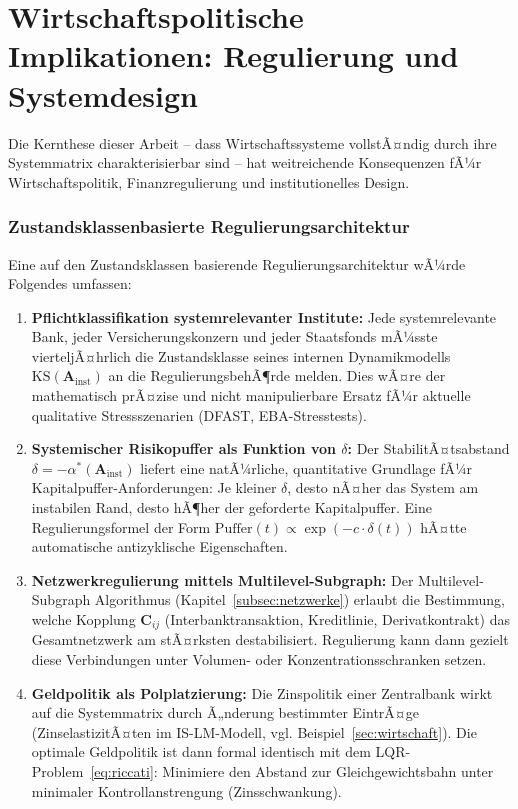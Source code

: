 ﻿\documentclass[12pt, a4paper, titlepage]{report}
\theoremstyle{definition}
\theoremstyle{remark}
\newcommand{\vA}{\bm{A}}
\newcommand{\vC}{\bm{C}}
\newcommand{\KS}{\mathrm{KS}}
\begin{document}
\section{Wirtschaftspolitische Implikationen: Regulierung und Systemdesign}
\label{subsec:wirtschaftspolitik}

Die Kernthese dieser Arbeit -- dass Wirtschaftssysteme vollstÃ¤ndig durch
ihre Systemmatrix charakterisierbar sind -- hat weitreichende Konsequenzen fÃ¼r
Wirtschaftspolitik, Finanzregulierung und institutionelles Design.

\subsubsection*{Zustandsklassenbasierte Regulierungsarchitektur}

Eine auf den Zustandsklassen basierende Regulierungsarchitektur wÃ¼rde Folgendes umfassen:

\begin{enumerate}[label=\textbf{R\arabic*.}]
  \item \textbf{Pflichtklassifikation systemrelevanter Institute:}
    Jede systemrelevante Bank, jeder Versicherungskonzern und jeder Staatsfonds
    mÃ¼sste vierteljÃ¤hrlich die Zustandsklasse seines internen Dynamikmodells
    $\KS(\vA_{\mathrm{inst}})$ an die RegulierungsbehÃ¶rde melden. Dies wÃ¤re der
    mathematisch prÃ¤zise und nicht manipulierbare Ersatz fÃ¼r aktuelle
    qualitative Stressszenarien (DFAST, EBA-Stresstests).

  \item \textbf{Systemischer Risikopuffer als Funktion von $\delta$:}
    Der StabilitÃ¤tsabstand $\delta = -\alpha^*(\vA_{\mathrm{inst}})$ liefert
    eine natÃ¼rliche, quantitative Grundlage fÃ¼r Kapitalpuffer-Anfor\-derungen:
    Je kleiner $\delta$, desto nÃ¤her das System am instabilen Rand, desto
    hÃ¶her der geforderte Kapitalpuffer. Eine Regulierungs\-formel der Form
    $\mathrm{Puffer}(t) \propto \exp(-c \cdot \delta(t))$ hÃ¤tte automatische
    antizyklische Eigenschaften.

  \item \textbf{Netzwerkregulierung mittels Multilevel-Subgraph:}
    Der Multilevel-Subgraph Algorithmus (Kapitel~\ref{subsec:netzwerke}) erlaubt
    die Bestimmung, welche Kopplung $\vC_{ij}$ (Interbanktransaktion, Kreditlinie,
    Derivatkontrakt) das Gesamtnetzwerk am stÃ¤rksten destabilisiert. Regulierung
    kann dann gezielt diese Verbindungen unter Volumen- oder Konzentrationsschranken
    setzen.

  \item \textbf{Geldpolitik als Polplatzierung:}
    Die Zinspolitik einer Zentralbank wirkt auf die Systemmatrix durch
    Ã„nderung bestimmter EintrÃ¤ge (ZinselastizitÃ¤ten im IS-LM-Modell, vgl.
    Beispiel~\ref{sec:wirtschaft}). Die optimale Geldpolitik ist dann formal
    identisch mit dem LQR-Problem~\eqref{eq:riccati}: Minimiere den Abstand
    zur Gleichgewichtsbahn unter minimaler Kontrollanstrengung (Zinsschwankung).
\end{enumerate}
\end{document}
